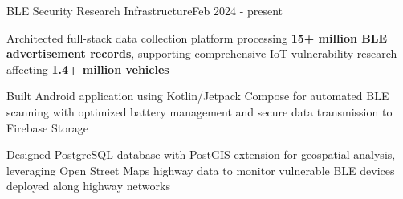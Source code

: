 \begin{joblong}{BLE Security Research Infrastructure}{Feb 2024 - present}
	\item Architected full-stack data collection platform processing \textbf{15+ million BLE advertisement records}, supporting comprehensive IoT vulnerability research affecting \textbf{1.4+ million vehicles}
	\item Built Android application using Kotlin/Jetpack Compose for automated BLE scanning with optimized battery management and secure data transmission to Firebase Storage
	\item Designed PostgreSQL database with PostGIS extension for geospatial analysis, leveraging Open Street Maps highway data to monitor vulnerable BLE devices deployed along highway networks
\end{joblong}
